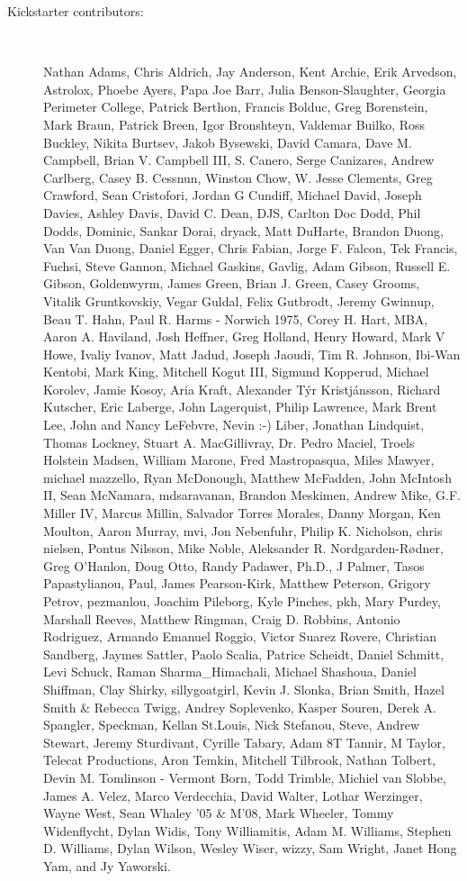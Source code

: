 \documentclass[11pt,final]{book}
\begin{document}
\begin{description}
 \item[Kickstarter contributors:] ~  
 
Nathan Adams,
Chris Aldrich,
Jay Anderson,
Kent Archie,
Erik Arvedson,
Astrolox,
Phoebe Ayers,
Papa Joe Barr,
Julia Benson-Slaughter, Georgia Perimeter College,
Patrick Berthon,
Francis Bolduc,
Greg Borenstein,
Mark Braun,
Patrick Breen,
Igor Bronshteyn,
Valdemar Buil\-ko,
Ross Buckley,
Nikita Burtsev,
Jakob Bysewski,
David Camara,
Dave M. Campbell,
Brian V. Campbell III,
S. Canero,
Serge Canizares,
Andrew Carlberg,
Casey B. Cessnun,
Winston Chow,
W. Jesse Clements,
Greg Crawford,
Sean Cristofori,
Jordan G Cundiff,
Michael David,
Joseph Davies,
Ashley Davis,
David C. Dean,
DJS,
Carlton Doc Dodd,
Phil Dodds,
Dominic,
Sankar Dorai,
dryack,
Matt DuHarte,
Brandon Duong,
Van Van Duong,
Daniel Egger,
Chris Fabian,
Jorge F. Falcon,
Tek Francis,
Fuchsi,
Steve Gannon,
Michael Gaskins,
Gavlig,
Adam Gibson,
Russell E. Gibson,
Goldenwyrm,
James Green,
Brian J. Green,
Casey Grooms,
Vitalik Gruntkovskiy,
Vegar Guldal,
Felix Gutbrodt,
Jeremy Gwinnup,
Beau T. Hahn,
Paul R. Harms - Norwich 1975,
Corey H. Hart, MBA,
Aaron A. Haviland,
Josh Heffner,
Greg Holland,
Henry Howard,
Mark V Howe,
Ivaliy Ivanov,
Matt Jadud,
Joseph Jaoudi,
Tim R. Johnson,
Ibi-Wan Kentobi,
Mark King,
Mitchell Kogut III,
Sigmund Kopperud,
Michael Korolev,
Jamie Kosoy,
Aria Kraft,
Alexander T{\'{y}}r Kristj{\'{a}}nsson,
Richard Kutscher,
Eric Laberge,
John Lagerquist,
Philip Lawrence,
Mark Brent Lee,
John and Nancy LeFebvre,
Nevin :-) Liber,
Jonathan Lindquist,
Thomas Lockney,
Stuart A. MacGillivray,
Dr. Pedro Maciel,
Troels Holstein Madsen,
William Marone,
Fred Mastropasqua,
Miles Mawyer,
michael mazzello,
Ryan McDonough,
Matthew McFadden,
John McIntosh II,
Sean McNamara,
mdsaravanan,
Brandon Meskimen,
Andrew Mike,
G.F. Miller IV,
Marcus Millin,
Salvador Torres Morales,
Danny Morgan,
Ken Moulton,
Aaron Murray,
mvi,
Jon Nebenfuhr,
Philip K. Nicholson,
chris nielsen,
Pontus Nilsson,
Mike Noble,
Aleksander R. Nord\-gar\-den-R{\o}d\-ner,
Greg O'Han\-lon,
Doug Otto,
Randy Padawer, Ph.D.,
J Palmer,
Tasos Papastylianou,
Paul,
James Pearson-Kirk,
Matthew Peterson,
Grigory Petrov,
pezmanlou,
Joachim Pileborg,
Kyle Pinches,
pkh,
Mary Purdey,
Marshall Reeves,
Matthew Ringman,
Craig D. Robbins,
Antonio Rodriguez,
Armando Emanuel Roggio,
Victor Suarez Rovere,
Christian Sandberg,
Jaymes Sattler,
Paolo Scalia,
Patrice Scheidt,
Daniel Schmitt,
Levi Schuck,
Raman Sharma\_Himachali,
Michael Shashoua,
Daniel Shiffman,
Clay Shirky,
sillygoatgirl,
Kevin J. Slonka,
Brian Smith,
Hazel Smith \& Rebecca Twigg,
Andrey Soplevenko,
Kasper Souren,
Derek A. Spangler,
Speckman,
Kellan St.Louis,
Nick Stefanou,
Steve,
Andrew Stewart,
Jeremy Sturdivant,
Cyrille Tabary,
Adam 8T Tannir,
M Taylor,
Telecat Productions,
Aron Temkin,
Mitchell Tilbrook,
Nathan Tolbert,
Devin M. Tomlinson - Vermont Born,
Todd Trimble,
Michiel van Slobbe,
James A. Velez,
Marco Verdecchia,
David Walter,
Lothar Werzinger,
Wayne West,
Sean Whaley '05 \& M'08,
Mark Wheeler,
Tommy Widenflycht,
Dylan Widis,
Tony Williamitis,
Adam M. Williams,
Stephen D. Williams,
Dylan Wilson,
Wesley Wiser,
wizzy,
Sam Wright,
Janet Hong Yam,
and
Jy Yaworski.


 \end{description}
\end{document}
